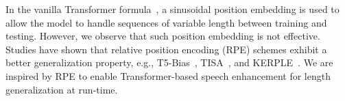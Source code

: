 \documentclass[journal]{IEEEtran}
\begin{document}





In the vanilla Transformer formula~\cite{attention2017}, a sinusoidal position embedding is used to allow the model to handle sequences of variable length between training and testing. However, we observe that such position embedding is not effective. Studies have shown that relative position encoding (RPE) schemes exhibit a better generalization property, e.g., T5-Bias~\cite{T5}, TISA~\cite{tisa}, and KERPLE~\cite{kerple}. We are inspired by RPE to enable Transformer-based speech enhancement for length generalization at run-time.
\end{document}
